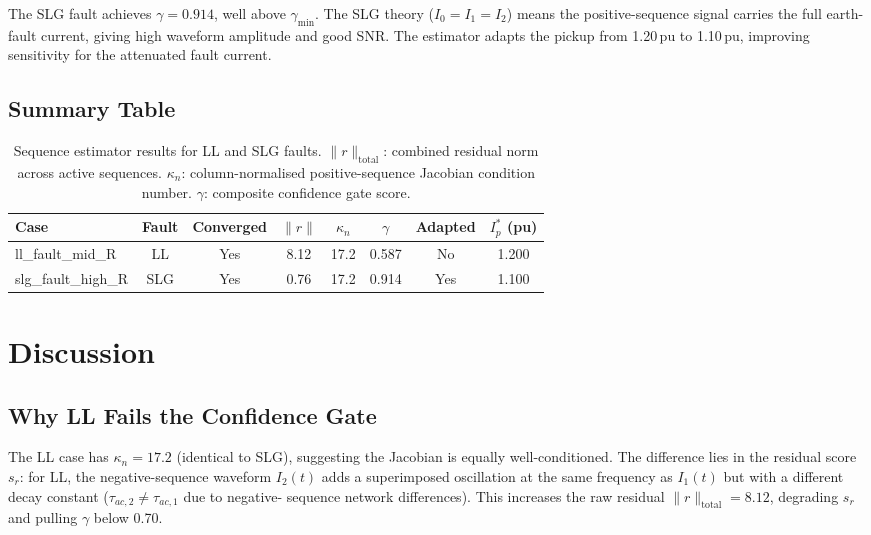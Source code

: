 \documentclass[12pt,a4paper]{article}
\theoremstyle{definition}
\theoremstyle{plain}
\begin{document}
The SLG fault achieves $\gamma = 0.914$, well above $\gamma_{\min}$.
The SLG theory ($I_0 = I_1 = I_2$) means the positive-sequence signal
carries the full earth-fault current, giving high waveform amplitude and
good SNR.  The estimator adapts the pickup from 1.20\,pu to 1.10\,pu,
improving sensitivity for the attenuated fault current.

\subsection{Summary Table}
\label{sec:results:summary}

\begin{table}[htbp]
  \centering
  \caption{Sequence estimator results for LL and SLG faults.
           $\lVert r\rVert_{\mathrm{total}}$: combined residual norm
           across active sequences.
           $\kappa_n$: column-normalised positive-sequence Jacobian
           condition number.
           $\gamma$: composite confidence gate score.}
  \label{tab:results}
  \small
  \begin{tabular}{lccccccc}
    \toprule
    Case & Fault & Converged & $\lVert r\rVert$ & $\kappa_n$ &
    $\gamma$ & Adapted & $I_p^*$ (pu) \\
    \midrule
    ll\_fault\_mid\_R    & LL  & Yes & 8.12 & 17.2 & 0.587 & No  & 1.200 \\
    slg\_fault\_high\_R  & SLG & Yes & 0.76 & 17.2 & 0.914 & Yes & 1.100 \\
    \bottomrule
  \end{tabular}
\end{table}

\section{Discussion}
\label{sec:disc}

\subsection{Why LL Fails the Confidence Gate}
\label{sec:disc:ll}

The LL case has $\kappa_n = 17.2$ (identical to SLG), suggesting the
Jacobian is equally well-conditioned.  The difference lies in the residual
score $s_r$: for LL, the negative-sequence waveform $I_2(t)$ adds a
superimposed oscillation at the same frequency as $I_1(t)$ but with a
different decay constant ($\tau_{ac,2} \neq \tau_{ac,1}$ due to negative-
sequence network differences).  This increases the raw residual
$\lVert r\rVert_{\mathrm{total}} = 8.12$, degrading $s_r$ and pulling
$\gamma$ below 0.70.
\end{document}
